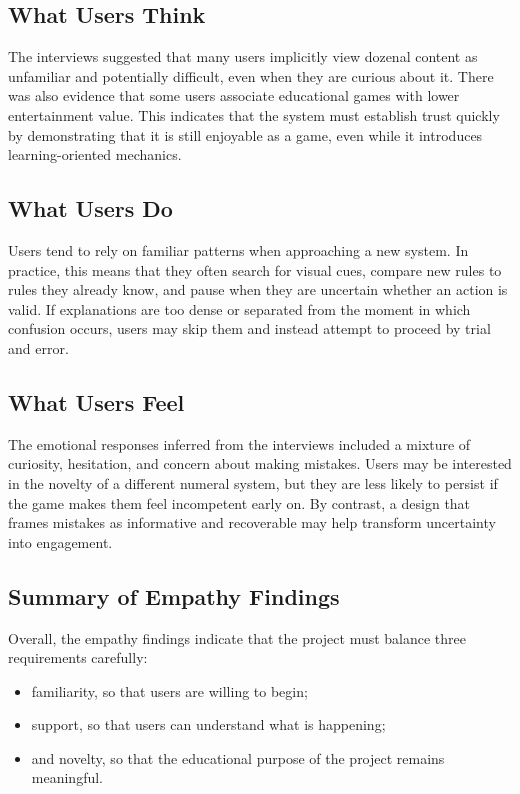 \documentclass[12pt]{article}
\begin{document}
    \subsection{What Users Think}

    The interviews suggested that many users implicitly view dozenal content as unfamiliar and potentially difficult, even when they are curious about it. There was also evidence that some users associate educational games with lower entertainment value. This indicates that the system must establish trust quickly by demonstrating that it is still enjoyable as a game, even while it introduces learning-oriented mechanics.

    \subsection{What Users Do}

    Users tend to rely on familiar patterns when approaching a new system. In practice, this means that they often search for visual cues, compare new rules to rules they already know, and pause when they are uncertain whether an action is valid. If explanations are too dense or separated from the moment in which confusion occurs, users may skip them and instead attempt to proceed by trial and error.

    \subsection{What Users Feel}

    The emotional responses inferred from the interviews included a mixture of curiosity, hesitation, and concern about making mistakes. Users may be interested in the novelty of a different numeral system, but they are less likely to persist if the game makes them feel incompetent early on. By contrast, a design that frames mistakes as informative and recoverable may help transform uncertainty into engagement.

    \subsection{Summary of Empathy Findings}

    Overall, the empathy findings indicate that the project must balance three requirements carefully:

    \begin{itemize}[leftmargin=2em]
        \item familiarity, so that users are willing to begin;
        \item support, so that users can understand what is happening;
        \item and novelty, so that the educational purpose of the project remains meaningful.
    \end{itemize}
\end{document}
